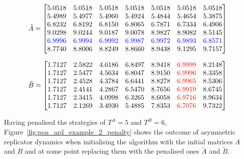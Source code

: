 \begin{equation*}
    \tilde{A} = 
    \begin{bmatrix}
        5.0518 & 5.0518 & 5.0518 & 5.0518 & 5.0518 &
        5.0518 & 5.0518  \\
        5.4989 & 5.4977 & 5.4960 & 5.4924 & 5.4844 &
        5.4654 & 5.3875 \\
        6.8232 & 6.8192 & 6.8150 & 6.8065 & 6.7871 &
        6.7334 & 6.4906 \\
        9.0298 & 9.0244 & 9.0187 & 9.0078 & 8.9827 &
        8.9082 & 8.5145 \\
        \color{blue}{6.9996} & \color{blue}{6.9994} & \color{blue}{6.9992} &
        \color{blue}{6.9987} & \color{blue}{6.9972} & \color{blue}{6.9893} &
        \color{blue}{6.8571} \\
        8.7740 & 8.8006 & 8.8249 & 8.8660 & 8.9438 &
        9.1295 & 9.7157 \\
    \end{bmatrix}
\end{equation*}


\begin{equation*}
    \tilde{B} = 
    \begin{bmatrix}
        1.7127 & 2.5822 & 4.6186 & 6.8497 & 8.9418 &
        \color{red}{6.9999} & 8.2148 \\
        1.7127 & 2.5477 & 4.5634 & 6.8047 & 8.9150 &
        \color{red}{6.9996} & 8.3358 \\
        1.7127 & 2.4528   & 4.3784 & 6.6441 & 8.8278 &
        \color{red}{6.9965} & 8.5306 \\
        1.7127 & 2.4141 & 4.2867 & 6.5470 & 8.7656 &
        \color{red}{6.9919} & 8.6745 \\
        1.7127 & 2.3415 & 4.0998 & 6.3265 & 8.6058 &
        \color{red}{6.9716} & 8.9634  \\
        1.7127 & 2.1269 & 3.4930 & 5.4885 & 7.8353 &
        \color{red}{6.7076} & 9.7322 \\
    \end{bmatrix}
\end{equation*}

Having penalised the strategies of \(T^A = 5\) and \(T^B = 6\),
Figure~\ref{fig:poa_ard_example_2_penalty} shows the outcome of asymmetric
replicator dynamics when initialising the algorithm with the initial matrices
\(A\) and \(B\) and at some point replacing them with the penalised ones
\(\tilde{A}\) and \(\tilde{B}\). 

